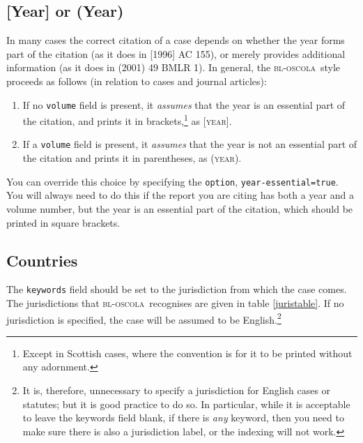 \documentclass[a4paper,
               11pt,
	       DIV=1,			   
	       footinclude=false]
	      {scrartcl}
\newcommand{\oscola}{\textsc{bl-oscola}}
\begin{document}
\subsection{[Year] or (Year)}

In\label{yearoptional} many cases the correct citation of a case depends on whether the
year forms part of the citation (as it does in [1996] AC 155), or
merely provides additional information (as it does in (2001) 49
BMLR 1). In general, the \oscola\ style proceeds as follows (in
relation to cases and journal articles):
\begin{enumerate}
\item If no \texttt{volume} field is present, it \emph{assumes} that
  the year is an essential part of the citation, and prints it in
  brackets,\footnote{Except in Scottish cases, where the convention is for it to be printed without any adornment.} as [\textsc{year}].
\item If a \texttt{volume} field is present, it \emph{assumes}
  that the year is not an essential part of the citation and prints it
  in parentheses, as (\textsc{year}).
\end{enumerate}

You can override this choice by specifying the \texttt{option},
\texttt{year-essential=true}. You will always need to do this if the
report you are citing has both a year and a volume number, but the
year is an essential part of the citation, which should be printed in square brackets.

\subsection{Countries\label{countries}}

The \texttt{keywords} field should be set to the jurisdiction from
which the case comes. The jurisdictions that \oscola\ recognises are
given in table \ref{juristable}. If no jurisdiction is specified, the
case will be assumed to be English.\footnote{It is, therefore,
  unnecessary to specify a jurisdiction for English cases or statutes;
  but it is good practice to do so. In particular, while it is
  acceptable to leave the keywords field blank, if there is
  \emph{any} keyword, then you need to make sure there is also a
  jurisdiction label, or the indexing will not work.}
\end{document}
